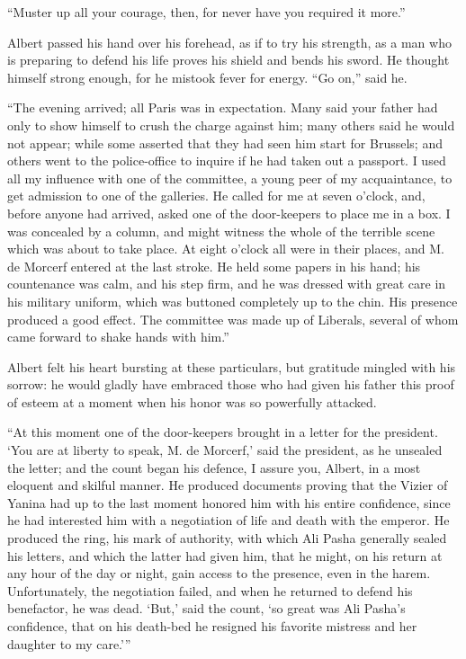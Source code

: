 “Muster up all your courage, then, for never have you required it
more.”

Albert passed his hand over his forehead, as if to try his strength, as
a man who is preparing to defend his life proves his shield and bends
his sword. He thought himself strong enough, for he mistook fever for
energy. “Go on,” said he.

“The evening arrived; all Paris was in expectation. Many said your
father had only to show himself to crush the charge against him; many
others said he would not appear; while some asserted that they had seen
him start for Brussels; and others went to the police-office to inquire
if he had taken out a passport. I used all my influence with one of the
committee, a young peer of my acquaintance, to get admission to one of
the galleries. He called for me at seven o’clock, and, before anyone
had arrived, asked one of the door-keepers to place me in a box. I was
concealed by a column, and might witness the whole of the terrible
scene which was about to take place. At eight o’clock all were in their
places, and M. de Morcerf entered at the last stroke. He held some
papers in his hand; his countenance was calm, and his step firm, and he
was dressed with great care in his military uniform, which was buttoned
completely up to the chin. His presence produced a good effect. The
committee was made up of Liberals, several of whom came forward to
shake hands with him.”

Albert felt his heart bursting at these particulars, but gratitude
mingled with his sorrow: he would gladly have embraced those who had
given his father this proof of esteem at a moment when his honor was so
powerfully attacked.

“At this moment one of the door-keepers brought in a letter for the
president. ‘You are at liberty to speak, M. de Morcerf,’ said the
president, as he unsealed the letter; and the count began his defence,
I assure you, Albert, in a most eloquent and skilful manner. He
produced documents proving that the Vizier of Yanina had up to the last
moment honored him with his entire confidence, since he had interested
him with a negotiation of life and death with the emperor. He produced
the ring, his mark of authority, with which Ali Pasha generally sealed
his letters, and which the latter had given him, that he might, on his
return at any hour of the day or night, gain access to the presence,
even in the harem. Unfortunately, the negotiation failed, and when he
returned to defend his benefactor, he was dead. ‘But,’ said the count,
‘so great was Ali Pasha’s confidence, that on his death-bed he resigned
his favorite mistress and her daughter to my care.’”

